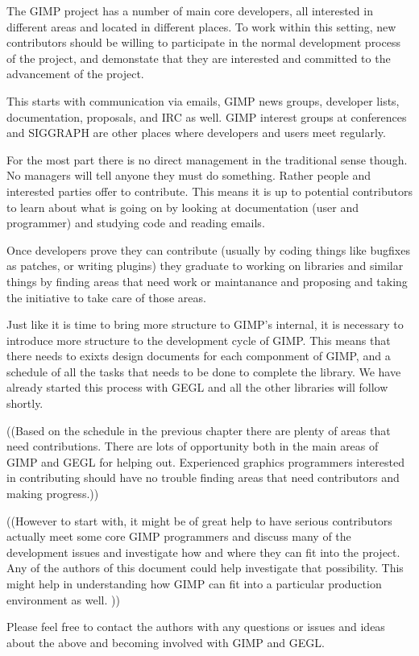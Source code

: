 The GIMP project has a number of main core developers, all interested in different areas and located in different places. To work within this setting, new contributors should be willing to participate in the normal development process of the project, and demonstate that they are interested and committed to the advancement of the project.
  
This starts with communication via emails, GIMP news groups, developer lists, documentation, proposals, and IRC as well. GIMP interest groups at conferences and SIGGRAPH are other places where developers and users meet regularly. 
 
For the most part there is no direct management in the traditional sense though. No managers will tell anyone they must do something. Rather people and interested parties offer to contribute. This means it is up to potential contributors to learn about what is going on by looking at documentation (user and programmer) and studying code and reading emails. 

Once developers prove they can contribute (usually by coding things like bugfixes as patches, or writing plugins) they graduate to working on libraries and similar things by finding areas that need work or maintanance and proposing and taking the initiative to take care of those areas.

Just like it is time to bring more structure to GIMP's internal, it is necessary to introduce more structure to the development cycle of GIMP. This means that there needs to exixts design documents for each componment of GIMP, and a schedule of all the tasks that needs to be done to complete the library. We have already started this process with GEGL and all the other libraries will follow shortly. 

 
((Based on the schedule in the previous chapter there are plenty of areas that need contributions. There are lots of opportunity both in the main areas of GIMP and GEGL for helping out. Experienced graphics programmers interested in contributing should have no trouble finding areas that need contributors and making progress.)) 


((However to start with, it might be of great help to have serious contributors actually meet some core GIMP programmers and discuss many of the development issues and investigate how and where they can fit into the project. Any of the authors of this document could help investigate that possibility. This might help in understanding how GIMP can fit into a particular production environment as well. ))

Please feel free to contact the authors with any questions or issues and ideas about the above and becoming involved with GIMP and GEGL.
